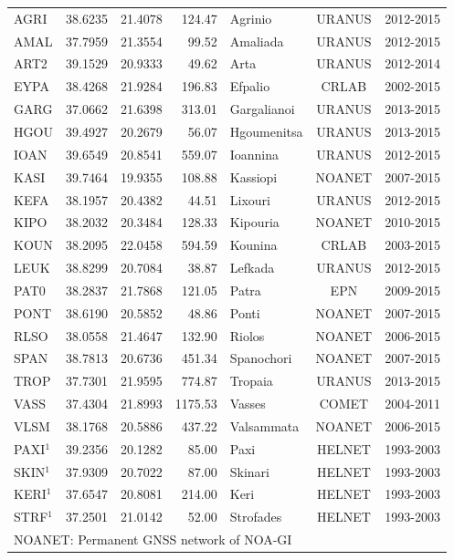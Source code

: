 \begin{extsum}
\begin{table}[H]
{\begin{center}
\begin{tabular*}{\linewidth}{@{\extracolsep{\fill}}l c c r l c c }
\midrule
AGRI & 38.6235 & 21.4078 & 124.47 & Agrinio & URANUS & 2012-2015\\
AMAL & 37.7959 & 21.3554 & 99.52 & Amaliada & URANUS & 2012-2015\\
ART2 & 39.1529 & 20.9333 & 49.62 & Arta & URANUS  & 2012-2014\\
EYPA & 38.4268 & 21.9284 & 196.83 & Efpalio & CRLAB & 2002-2015\\
GARG & 37.0662 & 21.6398 & 313.01 & Gargalianoi & URANUS  & 2013-2015\\
HGOU & 39.4927 & 20.2679 & 56.07 & Hgoumenitsa & URANUS  & 2013-2015\\
IOAN & 39.6549 & 20.8541 & 559.07 & Ioannina & URANUS & 2012-2015\\
KASI & 39.7464 & 19.9355 & 108.88 & Kassiopi & NOANET & 2007-2015\\
KEFA & 38.1957 & 20.4382 & 44.51 & Lixouri & URANUS  & 2012-2015\\
KIPO & 38.2032 & 20.3484 & 128.33 & Kipouria & NOANET & 2010-2015\\
KOUN & 38.2095 & 22.0458 & 594.59 & Kounina & CRLAB & 2003-2015\\
LEUK & 38.8299 & 20.7084 & 38.87 & Lefkada & URANUS  & 2012-2015\\
PAT0 & 38.2837 & 21.7868 & 121.05 & Patra & EPN& 2009-2015\\
PONT & 38.6190 & 20.5852 & 48.86 & Ponti & NOANET & 2007-2015\\
RLSO & 38.0558 & 21.4647 & 132.90 & Riolos & NOANET & 2006-2015\\
SPAN & 38.7813 & 20.6736 & 451.34 & Spanochori & NOANET & 2007-2015\\
TROP & 37.7301 & 21.9595 & 774.87 & Tropaia & URANUS  & 2013-2015\\
VASS & 37.4304 & 21.8993 & 1175.53 & Vasses & COMET & 2004-2011\\
VLSM & 38.1768 & 20.5886 & 437.22 & Valsammata & NOANET & 2006-2015\\
PAXI$^1$ & 39.2356 & 20.1282 & 85.00 & Paxi  & HELNET &  1993-2003\\
SKIN$^1$ & 37.9309 & 20.7022 & 87.00 & Skinari & HELNET & 1993-2003\\
KERI$^1$ & 37.6547 & 20.8081 & 214.00 & Keri & HELNET & 1993-2003\\
STRF$^1$ & 37.2501 & 21.0142 & 52.00 & Strofades & HELNET & 1993-2003 \\
\bottomrule
\multicolumn{7}{l}{NOANET: Permanent GNSS network of NOA-GI \citep{Ganas2008}}\\

\end{tabular*}
\end{center}}
\end{table}
\end{extsum}
